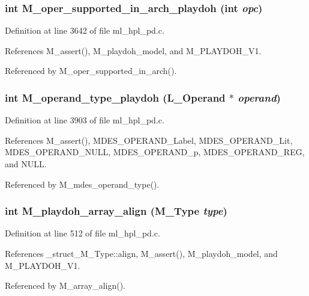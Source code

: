 \subsubsection{\setlength{\rightskip}{0pt plus 5cm}int M\_\-oper\_\-supported\_\-in\_\-arch\_\-playdoh (int {\em opc})}\label{ml__hpl__pd_8c_cb796e1dfbe723c436c49e603182625d}




Definition at line 3642 of file ml\_\-hpl\_\-pd.c.

References M\_\-assert(), M\_\-playdoh\_\-model, and M\_\-PLAYDOH\_\-V1.

Referenced by M\_\-oper\_\-supported\_\-in\_\-arch().
\subsubsection{\setlength{\rightskip}{0pt plus 5cm}int M\_\-operand\_\-type\_\-playdoh (L\_\-Operand $\ast$ {\em operand})}\label{ml__hpl__pd_8c_d7b4150de8ad05afd52a981f345e1b1f}




Definition at line 3903 of file ml\_\-hpl\_\-pd.c.

References M\_\-assert(), MDES\_\-OPERAND\_\-Label, MDES\_\-OPERAND\_\-Lit, MDES\_\-OPERAND\_\-NULL, MDES\_\-OPERAND\_\-p, MDES\_\-OPERAND\_\-REG, and NULL.

Referenced by M\_\-mdes\_\-operand\_\-type().
\subsubsection{\setlength{\rightskip}{0pt plus 5cm}int M\_\-playdoh\_\-array\_\-align (\bf{M\_\-Type} {\em type})}\label{ml__hpl__pd_8c_c3a0eec9a0a7b1c434594445ff2f2d71}




Definition at line 512 of file ml\_\-hpl\_\-pd.c.

References \_\-struct\_\-M\_\-Type::align, M\_\-assert(), M\_\-playdoh\_\-model, and M\_\-PLAYDOH\_\-V1.

Referenced by M\_\-array\_\-align().
